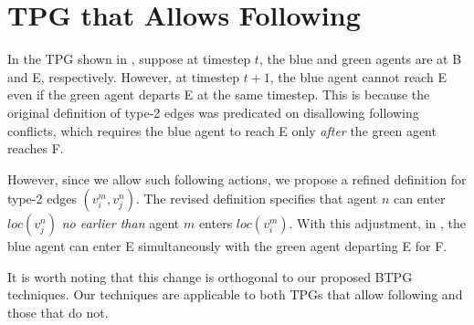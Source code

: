 \documentclass[letterpaper]{article} %
\theoremstyle{definition}
\newcommand{\rishi}[1]{\textcolor{black}{\textbf{Rishi:}}
\textcolor{purple}{#1}}
\newcommand{\andrew}[1]{\textcolor{black}{\textbf{Yifan:}} \textcolor{blue}{#1}}
\begin{document}



\section{TPG that Allows Following}
In the TPG shown in , suppose at timestep $t$, the blue and green agents are at B and E, respectively. However, at timestep $t+1$, the blue agent cannot reach E even if the green agent departs E at the same timestep. This is because the original definition of type-2 edges was predicated on disallowing following conflicts, which requires the blue agent to reach E only \emph{after} the green agent reaches F.

However, since we allow such following actions, we propose a refined definition for type-2 edges $(v_i^m, v_j^n)$. The revised definition specifies that agent $n$ can enter $loc(v_{j}^n)$ \emph{no earlier than} agent $m$ enters $loc(v_{i}^m)$.
With this adjustment, in , the blue agent can enter E simultaneously with the green agent departing E for F.

It is worth noting that this change is orthogonal to our proposed BTPG techniques. Our techniques are applicable to both TPGs that allow following and those that do not.
\end{document}
